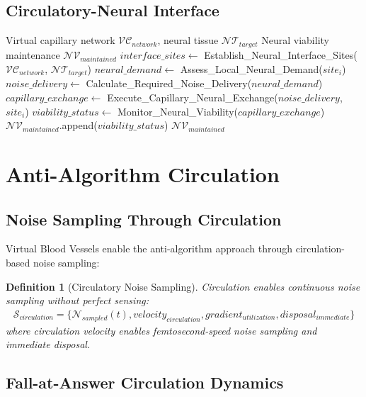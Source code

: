 \documentclass[12pt,a4paper]{article}
\newtheorem{definition}{Definition}
\begin{document}
\subsection{Circulatory-Neural Interface}

\begin{algorithm}
\caption{Neural-Circulatory Interface Protocol}
\begin{algorithmic}[1]
\REQUIRE Virtual capillary network $\mathcal{VC}_{network}$, neural tissue $\mathcal{NT}_{target}$
\ENSURE Neural viability maintenance $\mathcal{NV}_{maintained}$
\STATE $interface\_sites \leftarrow$ Establish\_Neural\_Interface\_Sites($\mathcal{VC}_{network}$, $\mathcal{NT}_{target}$)
    \STATE $neural\_demand \leftarrow$ Assess\_Local\_Neural\_Demand($site_i$)
    \STATE $noise\_delivery \leftarrow$ Calculate\_Required\_Noise\_Delivery($neural\_demand$)
    \STATE $capillary\_exchange \leftarrow$ Execute\_Capillary\_Neural\_Exchange($noise\_delivery$, $site_i$)
    \STATE $viability\_status \leftarrow$ Monitor\_Neural\_Viability($capillary\_exchange$)
    \STATE $\mathcal{NV}_{maintained}$.append($viability\_status$)
\ENDFOR
\RETURN $\mathcal{NV}_{maintained}$
\end{algorithmic}
\end{algorithm}

\section{Anti-Algorithm Circulation}

\subsection{Noise Sampling Through Circulation}

Virtual Blood Vessels enable the anti-algorithm approach through circulation-based noise sampling:

\begin{definition}[Circulatory Noise Sampling]
Circulation enables continuous noise sampling without perfect sensing:
\begin{align}
\mathcal{S}_{circulation} = \{\mathcal{N}_{sampled}(t), velocity_{circulation}, gradient_{utilization}, disposal_{immediate}\}
\end{align}
where circulation velocity enables femtosecond-speed noise sampling and immediate disposal.
\end{definition}

\subsection{Fall-at-Answer Circulation Dynamics}
\end{document}
